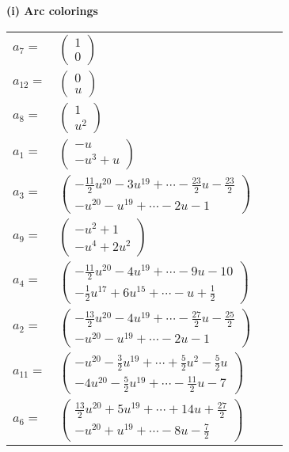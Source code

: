 \documentclass[1p]{elsarticle_modified}
\theoremstyle{definition}
\begin{document}
\flushleft \textbf{(i) Arc colorings}\\
\begin{tabular}{m{7pt} m{180pt} m{7pt} m{180pt} }
\flushright $a_{7}=$&$\begin{pmatrix}1\\0\end{pmatrix}$ \\
\flushright $a_{12}=$&$\begin{pmatrix}0\\u\end{pmatrix}$ \\
\flushright $a_{8}=$&$\begin{pmatrix}1\\u^2\end{pmatrix}$ \\
\flushright $a_{1}=$&$\begin{pmatrix}- u\\- u^3+u\end{pmatrix}$ \\
\flushright $a_{3}=$&$\begin{pmatrix}-\frac{11}{2} u^{20}-3 u^{19}+\cdots-\frac{23}{2} u-\frac{23}{2}\\- u^{20}- u^{19}+\cdots-2 u-1\end{pmatrix}$ \\
\flushright $a_{9}=$&$\begin{pmatrix}- u^2+1\\- u^4+2 u^2\end{pmatrix}$ \\
\flushright $a_{4}=$&$\begin{pmatrix}-\frac{11}{2} u^{20}-4 u^{19}+\cdots-9 u-10\\-\frac{1}{2} u^{17}+6 u^{15}+\cdots- u+\frac{1}{2}\end{pmatrix}$ \\
\flushright $a_{2}=$&$\begin{pmatrix}-\frac{13}{2} u^{20}-4 u^{19}+\cdots-\frac{27}{2} u-\frac{25}{2}\\- u^{20}- u^{19}+\cdots-2 u-1\end{pmatrix}$ \\
\flushright $a_{11}=$&$\begin{pmatrix}- u^{20}-\frac{3}{2} u^{19}+\cdots+\frac{5}{2} u^2-\frac{5}{2} u\\-4 u^{20}-\frac{5}{2} u^{19}+\cdots-\frac{11}{2} u-7\end{pmatrix}$ \\
\flushright $a_{6}=$&$\begin{pmatrix}\frac{13}{2} u^{20}+5 u^{19}+\cdots+14 u+\frac{27}{2}\\- u^{20}+u^{19}+\cdots-8 u-\frac{7}{2}\end{pmatrix}$ \\

\end{tabular}
\end{document}
